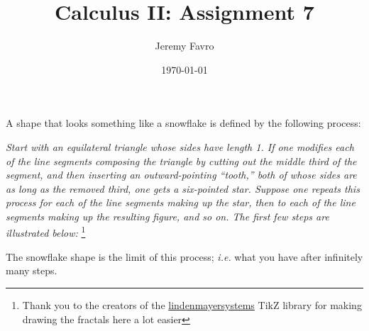 \documentclass[10pt]{article}
\title{Calculus II: Assignment 7}
\author{Jeremy Favro}
\date{\today}
\theoremstyle{definition}
\begin{document}
\maketitle

\noindent A shape that looks something like a snowflake is defined by the following process:\\

\begin{adjustwidth}{1cm}{1cm}
    \indent \indent \textit{Start with an equilateral triangle whose sides have length 1. If one modifies
        each of the line segments composing the triangle by cutting out the middle third
        of the segment, and then inserting an outward-pointing “tooth,” both of whose
        sides are as long as the removed third, one gets a six-pointed star. Suppose one
        repeats this process for each of the line segments making up the star, then to
        each of the line segments making up the resulting figure, and so on. The first
        few steps are illustrated below:}
    \footnote{Thank you to the creators of the \href{https://tikz.dev/library-lsystems}{lindenmayersystems} TikZ library for making drawing the fractals here a lot easier}
\end{adjustwidth}
\noindent The snowflake shape is the limit of this process; \emph{i.e.} what you have after infinitely many steps.\\
\end{document}
